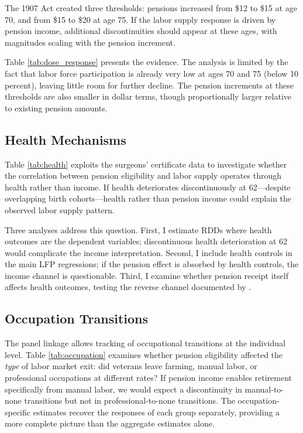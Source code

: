\documentclass[12pt]{article}
\begin{document}
The 1907 Act created three thresholds: pensions increased from \$12 to \$15 at age 70, and from \$15 to \$20 at age 75. If the labor supply response is driven by pension income, additional discontinuities should appear at these ages, with magnitudes scaling with the pension increment.

Table \ref{tab:dose_response} presents the evidence. The analysis is limited by the fact that labor force participation is already very low at ages 70 and 75 (below 10 percent), leaving little room for further decline. The pension increments at these thresholds are also smaller in dollar terms, though proportionally larger relative to existing pension amounts.



\subsection{Health Mechanisms}

Table \ref{tab:health} exploits the surgeons' certificate data to investigate whether the correlation between pension eligibility and labor supply operates through health rather than income. If health deteriorates discontinuously at 62---despite overlapping birth cohorts---health rather than pension income could explain the observed labor supply pattern.



Three analyses address this question. First, I estimate RDDs where health outcomes are the dependent variables; discontinuous health deterioration at 62 would complicate the income interpretation. Second, I include health controls in the main LFP regressions; if the pension effect is absorbed by health controls, the income channel is questionable. Third, I examine whether pension receipt itself affects health outcomes, testing the reverse channel documented by \citet{eli2015income}.

\subsection{Occupation Transitions}

The panel linkage allows tracking of occupational transitions at the individual level. Table \ref{tab:occupation} examines whether pension eligibility affected the \textit{type} of labor market exit: did veterans leave farming, manual labor, or professional occupations at different rates? If pension income enables retirement specifically from manual labor, we would expect a discontinuity in manual-to-none transitions but not in professional-to-none transitions. The occupation-specific estimates recover the responses of each group separately, providing a more complete picture than the aggregate estimates alone.
\end{document}
